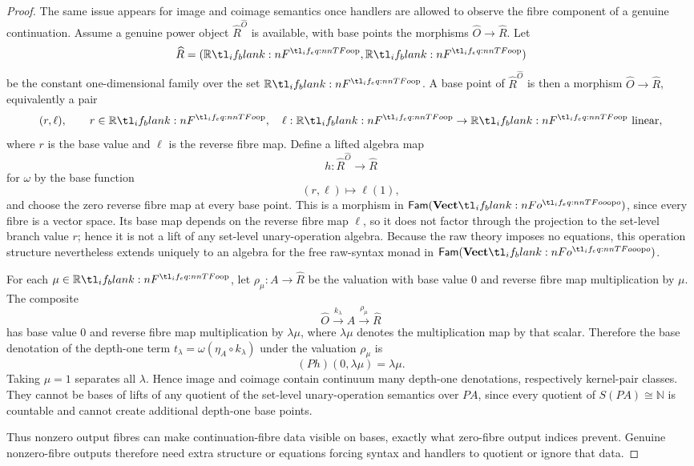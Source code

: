 \documentclass[11pt,a4paper]{article}
\theoremstyle{definition}
\theoremstyle{remark}
\providecommand{\N}{\mathbb{N}}
\providecommand{\Fam}[1]{\mathsf{Fam}(#1)}
\begin{document}
\begin{proof}
  The same issue appears for image and coimage semantics once handlers are
  allowed to observe the fibre component of a genuine continuation. Assume a
  genuine power object \(\widehat R^{\widehat O}\) is available, with base
  points the morphisms \(\widehat O\to\widehat R\). Let
  \[
    \widehat R=(\R,\R)
  \]
  be the constant one-dimensional family over the set \(\R\). A base point of
  \(\widehat R^{\widehat O}\) is then a morphism
  \(\widehat O\to\widehat R\), equivalently a pair
  \[
    (r,\ell),
    \qquad
    r\in\R,
    \quad
    \ell:\R\to\R \text{ linear},
  \]
  where \(r\) is the base value and \(\ell\) is the reverse fibre map. Define a
  lifted algebra map
  \[
    h:\widehat R^{\widehat O}\to\widehat R
  \]
  for \(\omega\) by the base function
  \[
    (r,\ell)\longmapsto \ell(1),
  \]
  and choose the zero reverse fibre map at every base point. This is a morphism
  in \(\Fam{\Vect[o]}\), since every fibre is a vector space. Its base map
  depends on the reverse fibre map \(\ell\), so it does not factor through the
  projection to the set-level branch value \(r\); hence it is not a lift of any
  set-level unary-operation algebra. Because the raw theory imposes no
  equations, this operation structure nevertheless extends uniquely to an
  algebra for the free raw-syntax monad in \(\Fam{\Vect[o]}\).

  For each \(\mu\in\R\), let
  \(\rho_{\mu}:A\to\widehat R\) be the valuation with base value \(0\) and
  reverse fibre map multiplication by \(\mu\). The composite
  \[
    \widehat O
      \xrightarrow{k_{\lambda}}
    A
      \xrightarrow{\rho_{\mu}}
    \widehat R
  \]
  has base value \(0\) and reverse fibre map multiplication by
  \(\lambda\mu\), where \(\lambda\mu\) denotes the multiplication map by
  that scalar. Therefore the base denotation of the depth-one term
  \(t_{\lambda}=\omega(\eta_A\circ k_{\lambda})\) under the valuation
  \(\rho_{\mu}\) is
  \[
    (P h)(0,\lambda\mu)=\lambda\mu .
  \]
  Taking \(\mu=1\) separates all \(\lambda\). Hence image and coimage contain
  continuum many depth-one denotations, respectively kernel-pair classes. They
  cannot be bases of lifts of any quotient of the set-level unary-operation
  semantics over \(PA\), since every quotient of \(S(PA)\cong\N\) is countable
  and cannot create additional depth-one base points.

  Thus nonzero output fibres can make continuation-fibre data visible on bases,
  exactly what zero-fibre output indices prevent. Genuine nonzero-fibre outputs
  therefore need extra structure or equations forcing syntax and handlers to
  quotient or ignore that data.
\end{proof}






\end{document}
